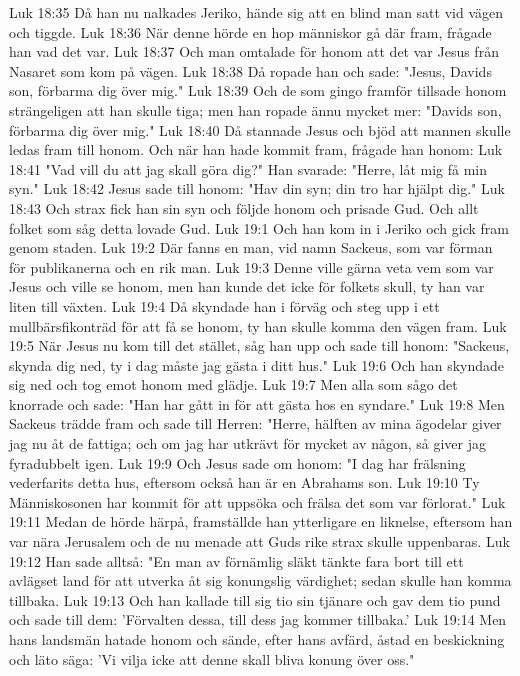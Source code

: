 Luk 18:35  Då han nu nalkades Jeriko, hände sig att en blind man satt vid vägen och tiggde.
Luk 18:36  När denne hörde en hop människor gå där fram, frågade han vad det var.
Luk 18:37  Och man omtalade för honom att det var Jesus från Nasaret som kom på vägen.
Luk 18:38  Då ropade han och sade: "Jesus, Davids son, förbarma dig över mig."
Luk 18:39  Och de som gingo framför tillsade honom strängeligen att han skulle tiga; men han ropade ännu mycket mer: "Davids son, förbarma dig över mig."
Luk 18:40  Då stannade Jesus och bjöd att mannen skulle ledas fram till honom. Och när han hade kommit fram, frågade han honom:
Luk 18:41  "Vad vill du att jag skall göra dig?" Han svarade: "Herre, låt mig få min syn."
Luk 18:42  Jesus sade till honom: "Hav din syn; din tro har hjälpt dig."
Luk 18:43  Och strax fick han sin syn och följde honom och prisade Gud. Och allt folket som såg detta lovade Gud.
Luk 19:1  Och han kom in i Jeriko och gick fram genom staden.
Luk 19:2  Där fanns en man, vid namn Sackeus, som var förman för publikanerna och en rik man.
Luk 19:3  Denne ville gärna veta vem som var Jesus och ville se honom, men han kunde det icke för folkets skull, ty han var liten till växten.
Luk 19:4  Då skyndade han i förväg och steg upp i ett mullbärsfikonträd för att få se honom, ty han skulle komma den vägen fram.
Luk 19:5  När Jesus nu kom till det stället, såg han upp och sade till honom: "Sackeus, skynda dig ned, ty i dag måste jag gästa i ditt hus."
Luk 19:6  Och han skyndade sig ned och tog emot honom med glädje.
Luk 19:7  Men alla som sågo det knorrade och sade: "Han har gått in för att gästa hos en syndare."
Luk 19:8  Men Sackeus trädde fram och sade till Herren: "Herre, hälften av mina ägodelar giver jag nu åt de fattiga; och om jag har utkrävt för mycket av någon, så giver jag fyradubbelt igen.
Luk 19:9  Och Jesus sade om honom: "I dag har frälsning vederfarits detta hus, eftersom också han är en Abrahams son.
Luk 19:10  Ty Människosonen har kommit för att uppsöka och frälsa det som var förlorat."
Luk 19:11  Medan de hörde härpå, framställde han ytterligare en liknelse, eftersom han var nära Jerusalem och de nu menade att Guds rike strax skulle uppenbaras.
Luk 19:12  Han sade alltså: "En man av förnämlig släkt tänkte fara bort till ett avlägset land för att utverka åt sig konungslig värdighet; sedan skulle han komma tillbaka.
Luk 19:13  Och han kallade till sig tio sin tjänare och gav dem tio pund och sade till dem: 'Förvalten dessa, till dess jag kommer tillbaka.'
Luk 19:14  Men hans landsmän hatade honom och sände, efter hans avfärd, åstad en beskickning och läto säga: 'Vi vilja icke att denne skall bliva konung över oss."
